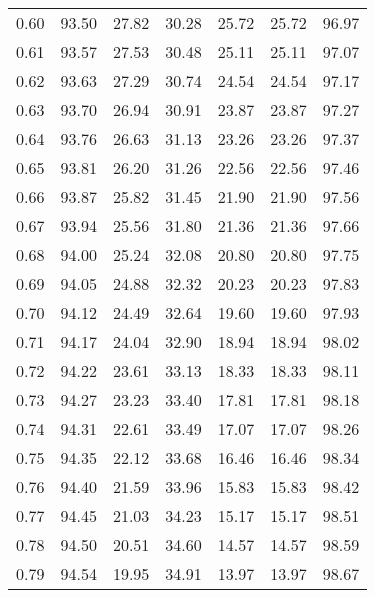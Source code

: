 \begin{tabular}{|c|c|c|c|c|c|c|}
      0.60 &     93.50 &     27.82 &      30.28 &   25.72 &      25.72 &         96.97 \\
      0.61 &     93.57 &     27.53 &      30.48 &   25.11 &      25.11 &         97.07 \\
      0.62 &     93.63 &     27.29 &      30.74 &   24.54 &      24.54 &         97.17 \\
      0.63 &     93.70 &     26.94 &      30.91 &   23.87 &      23.87 &         97.27 \\
      0.64 &     93.76 &     26.63 &      31.13 &   23.26 &      23.26 &         97.37 \\
      0.65 &     93.81 &     26.20 &      31.26 &   22.56 &      22.56 &         97.46 \\
      0.66 &     93.87 &     25.82 &      31.45 &   21.90 &      21.90 &         97.56 \\
      0.67 &     93.94 &     25.56 &      31.80 &   21.36 &      21.36 &         97.66 \\
      0.68 &     94.00 &     25.24 &      32.08 &   20.80 &      20.80 &         97.75 \\
      0.69 &     94.05 &     24.88 &      32.32 &   20.23 &      20.23 &         97.83 \\
      0.70 &     94.12 &     24.49 &      32.64 &   19.60 &      19.60 &         97.93 \\
      0.71 &     94.17 &     24.04 &      32.90 &   18.94 &      18.94 &         98.02 \\
      0.72 &     94.22 &     23.61 &      33.13 &   18.33 &      18.33 &         98.11 \\
      0.73 &     94.27 &     23.23 &      33.40 &   17.81 &      17.81 &         98.18 \\
      0.74 &     94.31 &     22.61 &      33.49 &   17.07 &      17.07 &         98.26 \\
      0.75 &     94.35 &     22.12 &      33.68 &   16.46 &      16.46 &         98.34 \\
      0.76 &     94.40 &     21.59 &      33.96 &   15.83 &      15.83 &         98.42 \\
      0.77 &     94.45 &     21.03 &      34.23 &   15.17 &      15.17 &         98.51 \\
      0.78 &     94.50 &     20.51 &      34.60 &   14.57 &      14.57 &         98.59 \\
      0.79 &     94.54 &     19.95 &      34.91 &   13.97 &      13.97 &         98.67 \\

\end{tabular}
